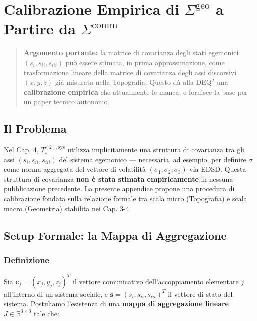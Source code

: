 \chapter{\texorpdfstring{Calibrazione Empirica di
\(\Sigma^{\text{geo}}\) a Partire da
\(\Sigma^{\text{comm}}\)}{Calibrazione Empirica di \textbackslash Sigma\^{}\{\textbackslash text\{geo\}\} a Partire da \textbackslash Sigma\^{}\{\textbackslash text\{comm\}\}}}\label{calibrazione-empirica-di-sigmatextgeo-a-partire-da-sigmatextcomm}

\begin{quote}
\textbf{Argomento portante:} la matrice di covarianza degli stati
egemonici \((s_i, s_{ii}, s_{iii})\) può essere stimata, in prima
approssimazione, come trasformazione lineare della matrice di covarianza
degli assi discorsivi \((x, y, z)\) già misurata nella Topografia.
Questo dà alla DEQ$^2$ una \textbf{calibrazione empirica} che attualmente
le manca, e fornisce la base per un paper tecnico autonomo.
\end{quote}



\section{Il Problema}\label{il-problema}

Nel Cap. 4, \(T_s^{(2),\text{sys}}\) utilizza implicitamente una
struttura di covarianza tra gli assi \((s_i, s_{ii}, s_{iii})\) del
sistema egemonico --- necessaria, ad esempio, per definire \(\sigma\)
come norma aggregata del vettore di volatilità
\((\sigma_1, \sigma_2, \sigma_3)\) via EDSD. Questa struttura di
covarianza \textbf{non è stata stimata empiricamente} in nessuna
pubblicazione precedente. La presente appendice propone una procedura di
calibrazione fondata sulla relazione formale tra scala micro
(Topografia) e scala macro (Geometria) stabilita nei Cap. 3-4.



\section{Setup Formale: la Mappa di
Aggregazione}\label{setup-formale-la-mappa-di-aggregazione}

\subsection{Definizione}\label{definizione}

Sia \(\mathbf{c}_j = (x_j, y_j, z_j)^T\) il vettore comunicativo
dell'accoppiamento elementare \(j\) all'interno di un sistema sociale, e
\(\mathbf{s} = (s_i, s_{ii}, s_{iii})^T\) il vettore di stato del
sistema. Postuliamo l'esistenza di una \textbf{mappa di aggregazione
lineare} \(J \in \mathbb{R}^{3 \times 3}\) tale che:

